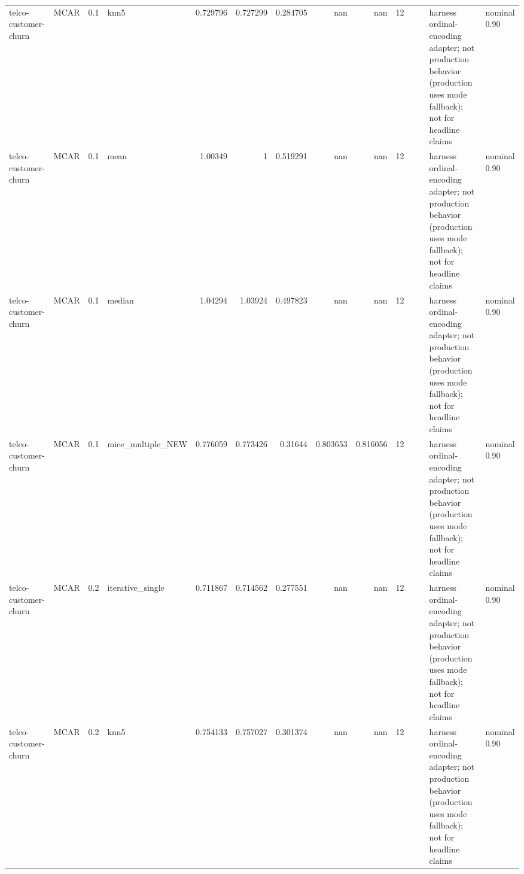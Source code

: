 \begin{table}[ht]
\begin{tabular}{llrlrrrrrrllll}
 telco-customer-churn & MCAR        &         0.1 & knn5              &       0.729796 &             0.727299 &                 0.284705 &                     nan        &                       nan        &        12 &                    &                                         & harness ordinal-encoding adapter; not production behavior (production uses mode fallback); not for headline claims & nominal 0.90              \\
 telco-customer-churn & MCAR        &         0.1 & mean              &       1.00349  &             1        &                 0.519291 &                     nan        &                       nan        &        12 &                    &                                         & harness ordinal-encoding adapter; not production behavior (production uses mode fallback); not for headline claims & nominal 0.90              \\
 telco-customer-churn & MCAR        &         0.1 & median            &       1.04294  &             1.03924  &                 0.497823 &                     nan        &                       nan        &        12 &                    &                                         & harness ordinal-encoding adapter; not production behavior (production uses mode fallback); not for headline claims & nominal 0.90              \\
 telco-customer-churn & MCAR        &         0.1 & mice\_multiple\_NEW &       0.776059 &             0.773426 &                 0.31644  &                       0.803653 &                         0.816056 &        12 &                    &                                         & harness ordinal-encoding adapter; not production behavior (production uses mode fallback); not for headline claims & nominal 0.90              \\
 telco-customer-churn & MCAR        &         0.2 & iterative\_single  &       0.711867 &             0.714562 &                 0.277551 &                     nan        &                       nan        &        12 &                    &                                         & harness ordinal-encoding adapter; not production behavior (production uses mode fallback); not for headline claims & nominal 0.90              \\
 telco-customer-churn & MCAR        &         0.2 & knn5              &       0.754133 &             0.757027 &                 0.301374 &                     nan        &                       nan        &        12 &                    &                                         & harness ordinal-encoding adapter; not production behavior (production uses mode fallback); not for headline claims & nominal 0.90              \\

\end{tabular}
\end{table}
